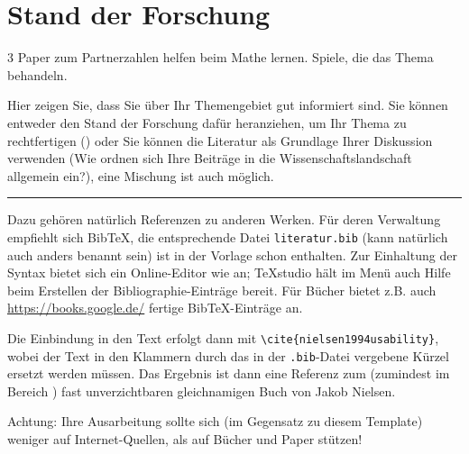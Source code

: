 
\chapter{Stand der Forschung}
3 Paper zum Partnerzahlen helfen beim Mathe lernen. Spiele, die das Thema behandeln.

Hier zeigen Sie, dass Sie über Ihr Themengebiet gut informiert sind. Sie können entweder den Stand der Forschung dafür heranziehen, um Ihr Thema zu rechtfertigen () oder Sie können die Literatur als Grundlage Ihrer Diskussion verwenden (Wie ordnen sich Ihre Beiträge in die Wissenschaftslandschaft allgemein ein?), eine Mischung ist auch möglich.

\hfil\rule{0.4\textwidth}{0.4pt}

Dazu gehören natürlich Referenzen zu anderen Werken. Für deren Verwaltung empfiehlt sich BibTeX, die entsprechende Datei \verb|literatur.bib| (kann natürlich auch anders benannt sein) ist in der Vorlage schon enthalten. Zur Einhaltung der Syntax bietet sich ein Online-Editor wie \cite{BibTexOnlineEditor} an; TeXstudio \cite{texstudio} hält im Menü auch Hilfe beim Erstellen der Bibliographie-Einträge bereit. Für Bücher bietet z.B. auch \url{https://books.google.de/} fertige BibTeX-Einträge an.

Die Einbindung in den Text erfolgt dann mit \verb|\cite{nielsen1994usability}|, wobei der Text in den Klammern durch das in der \verb|.bib|-Datei vergebene Kürzel ersetzt werden müssen. Das Ergebnis ist dann eine Referenz zum (zumindest im Bereich ) fast unverzichtbaren gleichnamigen Buch \cite{nielsen1994usability} von Jakob Nielsen.

Achtung: Ihre Ausarbeitung sollte sich (im Gegensatz zu diesem Template) weniger auf Internet-Quellen, als auf Bücher und Paper stützen!
\\
